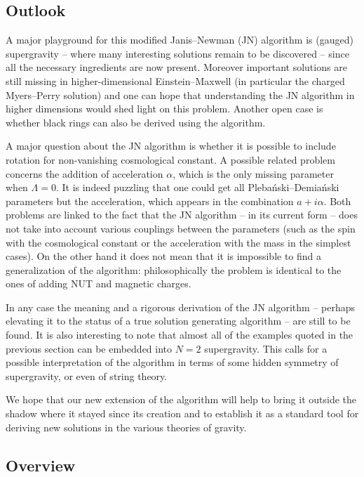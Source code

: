 \subsection{Outlook}



A major playground for this modified Janis--Newman (JN) algorithm is (gauged) supergravity -- where many interesting solutions remain to be discovered -- since all the necessary ingredients are now present.
Moreover important solutions are still missing in higher-dimensional Einstein--Maxwell (in particular the charged Myers--Perry solution) and one can hope that understanding the JN algorithm in higher dimensions would shed light on this problem.
Another open case is whether black rings can also be derived using the algorithm.

A major question about the JN algorithm is whether it is possible to include rotation for non-vanishing cosmological constant.
A possible related problem concerns the addition of acceleration $\alpha$, which is the only missing parameter when $\Lambda = 0$.
It is indeed puzzling that one could get all Plebański--Demiański parameters but the acceleration, which appears in the combination $a + i \alpha$.
Both problems are linked to the fact that the JN algorithm -- in its current form -- does not take into account various couplings between the parameters (such as the spin with the cosmological constant or the acceleration with the mass in the simplest cases).
On the other hand it does not mean that it is impossible to find a generalization of the algorithm: philosophically the problem is identical to the ones of adding NUT and magnetic charges.


In any case the meaning and a rigorous derivation of the JN algorithm -- perhaps elevating it to the status of a true solution generating algorithm -- are still to be found.
It is also interesting to note that almost all of the examples quoted in the previous section can be embedded into $N = 2$ supergravity.
This calls for a possible interpretation of the algorithm in terms of some hidden symmetry of supergravity, or even of string theory.

We hope that our new extension of the algorithm will help to bring it outside the shadow where it stayed since its creation and to establish it as a standard tool for deriving new solutions in the various theories of gravity.



\subsection{Overview}


